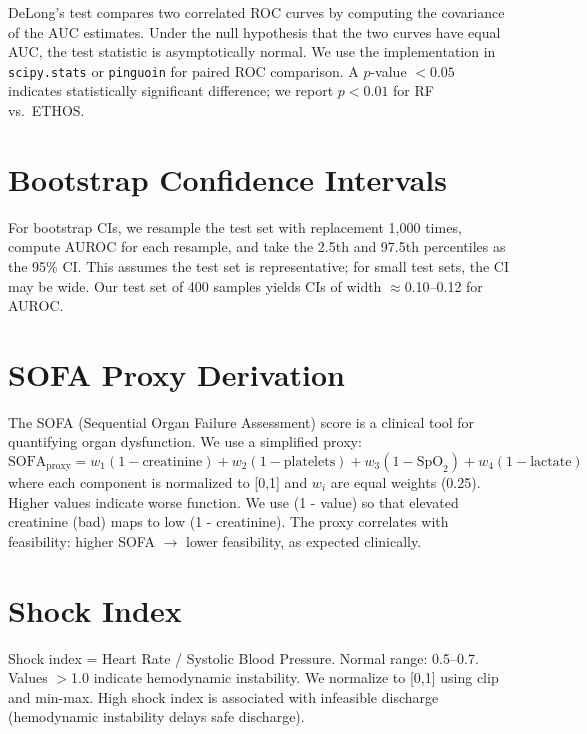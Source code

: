 DeLong's test compares two correlated ROC curves by computing the covariance of the AUC estimates. Under the null hypothesis that the two curves have equal AUC, the test statistic is asymptotically normal. We use the implementation in \texttt{scipy.stats} or \texttt{pinguoin} for paired ROC comparison. A $p$-value $< 0.05$ indicates statistically significant difference; we report $p < 0.01$ for RF vs.\ ETHOS.

\section{Bootstrap Confidence Intervals}

For bootstrap CIs, we resample the test set with replacement 1,000 times, compute AUROC for each resample, and take the 2.5th and 97.5th percentiles as the 95\% CI. This assumes the test set is representative; for small test sets, the CI may be wide. Our test set of 400 samples yields CIs of width $\approx$0.10--0.12 for AUROC.

\section{SOFA Proxy Derivation}

The SOFA (Sequential Organ Failure Assessment) score is a clinical tool for quantifying organ dysfunction. We use a simplified proxy:
\begin{equation}
\text{SOFA}_{\text{proxy}} = w_1(1 - \text{creatinine}) + w_2(1 - \text{platelets}) + w_3(1 - \text{SpO}_2) + w_4(1 - \text{lactate})
\end{equation}
where each component is normalized to [0,1] and $w_i$ are equal weights (0.25). Higher values indicate worse function. We use (1 - value) so that elevated creatinine (bad) maps to low (1 - creatinine). The proxy correlates with feasibility: higher SOFA $\to$ lower feasibility, as expected clinically.

\section{Shock Index}

Shock index = Heart Rate / Systolic Blood Pressure. Normal range: 0.5--0.7. Values $>$1.0 indicate hemodynamic instability. We normalize to [0,1] using clip and min-max. High shock index is associated with infeasible discharge (hemodynamic instability delays safe discharge).
